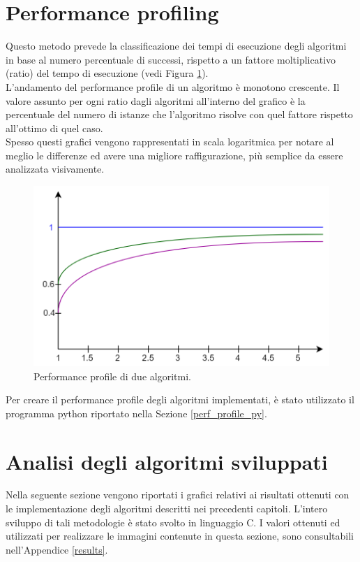 \section{Performance profiling}
Questo metodo prevede la classificazione dei tempi di esecuzione degli algoritmi in base al numero percentuale di successi, rispetto a un fattore moltiplicativo (ratio) del tempo di esecuzione (vedi Figura \ref{perf_profile}).\\
L'andamento del performance profile di un algoritmo è monotono crescente. Il valore assunto per ogni ratio dagli algoritmi all'interno del grafico è la percentuale del numero di istanze che l'algoritmo risolve con quel fattore rispetto all'ottimo di quel caso.\\
Spesso questi grafici vengono rappresentati in scala logaritmica per notare al meglio le differenze ed avere una migliore raffigurazione, più semplice da essere analizzata visivamente.
\begin{figure}[h] 
\begin{center} 
  \includegraphics[scale=0.3]{Images/perf_profile} 
  \caption{\footnotesize{Performance profile di due algoritmi.}}
  \label{perf_profile} 
\end{center} 
\end{figure}
Per creare il performance profile degli algoritmi implementati, è stato utilizzato il programma python riportato nella Sezione \ref{perf_profile_py}. 

\section{Analisi degli algoritmi sviluppati}
Nella seguente sezione vengono riportati i grafici relativi ai risultati ottenuti con le implementazione degli algoritmi descritti nei precedenti capitoli. L'intero sviluppo di tali metodologie è stato svolto in linguaggio C. I valori ottenuti ed utilizzati per realizzare le immagini contenute in questa sezione, sono consultabili nell'Appendice \ref{results}.
